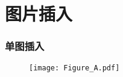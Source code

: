 
\section{图片插入}

\begin{frame}
	\frametitle{单图插入}
	\begin{figure}
		\texttt{[image: Figure\_A.pdf]}
	\end{figure}
\end{frame}